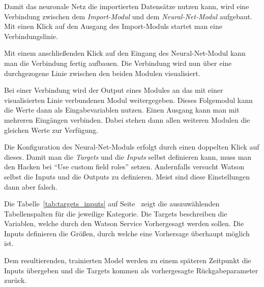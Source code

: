 Damit das neuronale Netz die importierten Datensätze nutzen kann, wird eine Verbindung zwischen dem \textit{Import-Modul}
und dem \textit{Neural-Net-Modul} aufgebaut. Mit einen Klick auf den Ausgang des Import-Moduls startet man eine
Verbindungslinie.

Mit einem anschließenden Klick auf den Eingang des Neural-Net-Modul kann man die Verbindung fertig aufbauen. Die Verbindung
wird nun über eine durchgezogene Linie zwischen den beiden Modulen visualisiert.

Bei einer Verbindung wird der Output eines Modules an das mit einer visualisierten Linie verbundenen Modul weitergegeben.
Dieses Folgemodul kann die Werte dann als Eingabevariablen nutzen. Einen Ausgang kann man mit mehreren Eingängen
verbinden. Dabei stehen dann allen weiteren Modulen die gleichen Werte zur Verfügung.

Die Konfiguration des Neural-Net-Moduls erfolgt durch einen doppelten Klick auf dieses. Damit man die
\textit{Targets} und die \textit{Inputs} selbst definieren kann, muss man den Hacken bei \enquote{Use custom field roles}
setzen. Andernfalls versucht Watson selbst die Inputs und die Outputs zu definieren. Meist sind diese Einstellungen dann
aber falsch.

Die Tabelle~\ref{tab:targets_inputs} auf Seite~\pageref{tab:targets_inputs} zeigt die auszuwählenden Tabellenspalten für
die jeweilige Kategorie. Die Targets beschreiben die Variablen, welche durch den Watson Service Vorhergesagt werden
sollen. Die Inputs definieren die Größen, durch welche eine Vorhersage überhaupt möglich ist.

Dem resultierenden, trainierten Model werden zu einem späteren Zeitpunkt die Inputs übergeben und die Targets kommen als
vorhergesagte Rückgabeparameter zurück.

